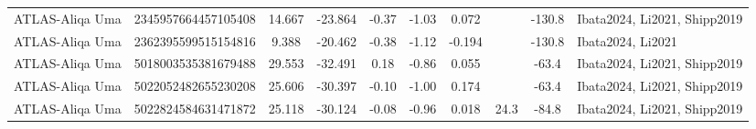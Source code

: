 \begin{tabular}{lcSSSSSSSl}
ATLAS-Aliqa Uma & 2345957664457105408 & 14.667 & -23.864 & -0.37 & -1.03 & 0.072 &  & -130.8 & Ibata2024, Li2021, Shipp2019 \\
ATLAS-Aliqa Uma & 2362395599515154816 & 9.388 & -20.462 & -0.38 & -1.12 & -0.194 &  & -130.8 & Ibata2024, Li2021 \\
ATLAS-Aliqa Uma & 5018003535381679488 & 29.553 & -32.491 & 0.18 & -0.86 & 0.055 &  & -63.4 & Ibata2024, Li2021, Shipp2019 \\
ATLAS-Aliqa Uma & 5022052482655230208 & 25.606 & -30.397 & -0.10 & -1.00 & 0.174 &  & -63.4 & Ibata2024, Li2021, Shipp2019 \\
ATLAS-Aliqa Uma & 5022824584631471872 & 25.118 & -30.124 & -0.08 & -0.96 & 0.018 & 24.3 & -84.8 & Ibata2024, Li2021, Shipp2019 \\
\hline
\end{tabular}